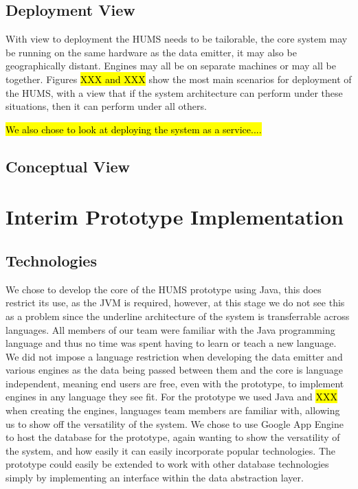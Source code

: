 \documentclass[10pt,a4paper]{article}
\begin{document}
\subsection{Deployment View}
With view to deployment the HUMS needs to be tailorable, the core system may be running on the same hardware as the data emitter, it may also be geographically distant. Engines may all be on separate machines or may all be together. Figures \hl{XXX and XXX} show the most main scenarios for deployment of the HUMS, with a view that if the system architecture can perform under these situations, then it can perform under all others.

\hl{We also chose to look at deploying the system as a service....}

\subsection{Conceptual View}

\section{Interim Prototype Implementation}

\subsection{Technologies}
We chose to develop the core of the HUMS prototype using Java, this does restrict its use, as the JVM is required, however, at this stage we do not see this as a problem since the underline architecture of the system is transferrable across languages.
All members of our team were familiar with the Java programming language and thus no time was spent having to learn or teach a new language. 
We did not impose a language restriction when developing the data emitter and various engines as the data being passed between them and the core is language independent, meaning end users are free, even with the prototype, to implement engines in any language they see fit. For the prototype we used Java and \hl{XXX} when creating the engines, languages team members are familiar with, allowing us to show off the versatility of the system.
We chose to use Google App Engine to host the database for the prototype, again wanting to show the versatility of the system, and how easily it can easily incorporate popular technologies. The prototype could easily be extended to work with other database technologies simply by implementing an interface within the data abstraction layer.
\end{document}

